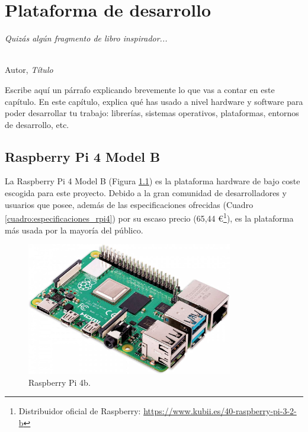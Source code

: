 \chapter{Plataforma de desarrollo}
\label{cap:capitulo3}

\begin{flushright}
\begin{minipage}[]{10cm}
\emph{Quizás algún fragmento de libro inspirador...}\\
\end{minipage}\\

Autor, \textit{Título}\\
\end{flushright}

\vspace{1cm}

Escribe aquí un párrafo explicando brevemente lo que vas a contar en este capítulo. En este capítulo, explica qué has usado a nivel hardware y software para poder desarrollar tu trabajo: librerías, sistemas operativos, plataformas, entornos de desarrollo, etc.

\section{Raspberry Pi 4 Model B}

La Raspberry Pi 4 Model B (Figura \ref{fig:raspberry2}) es la plataforma hardware de bajo coste escogida para este proyecto. Debido a la gran comunidad de desarrolladores y usuarios que posee, además de las especificaciones ofrecidas (Cuadro \ref{cuadro:especificaciones_rpi4}) por su escaso precio (65,44 \euro\footnote{Distribuidor oficial de Raspberry: \url{https://www.kubii.es/40-raspberry-pi-3-2-b}}), es la plataforma más usada por la mayoría del público.\\

\begin{figure} [h!]
  \begin{center}
    \includegraphics[width=9cm]{figs/raspberry.jpg}
  \end{center}
  \caption{Raspberry Pi 4b.}
  \label{fig:raspberry2}
\end{figure}

